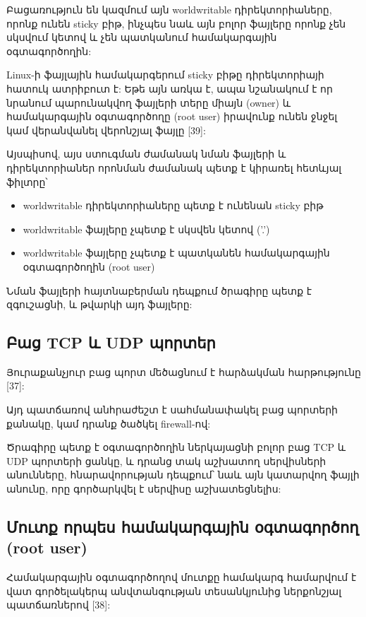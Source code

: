 \documentclass[a4paper,12pt]{article}
\begin{document}
\begin{sloppypar}
Բացառություն են կազմում այն worldwritable դիրեկտորիաները, որոնք ունեն
sticky բիթ, ինչպես նաև այն բոլոր ֆայլերը որոնք չեն սկսվում կետով և չեն
պատկանում համակարգային օգտագործողին:

Linux-ի ֆայլային համակարգերում sticky բիթը դիրեկտորիայի հատուկ ատրիբուտ է:
Եթե այն առկա է, ապա նշանակում է որ նրանում պարունակվող ֆայլերի տերը միայն (owner)
և համակարգային օգտագործողը (root user) իրավունք ունեն ջնջել կամ վերանվանել
վերոնշյալ ֆայլը [39]:

Այսպիսով, այս ստուգման ժամանակ նման ֆայլերի և դիրեկտորիաներ որոնման ժամանակ
պետք է կիրառել հետևյալ ֆիլտրը՝

\begin{itemize}
\item worldwritable դիրեկտորիաները պետք է ունենան sticky բիթ
\item worldwritable ֆայլերը չպետք է սկսվեն կետով ('.')
\item worldwritable ֆայլերը չպետք է պատկանեն համակարգային օգտագործողին
	(root user)
\end{itemize}

Նման ֆայլերի հայտնաբերման դեպքում ծրագիրը պետք է զգուշացնի,
և թվարկի այդ ֆայլերը:


\subsection{Բաց TCP և UDP պորտեր}


Յուրաքանչյուր բաց պորտ մեծացնում է հարձակման հարթությունը [37]:

Այդ պատճառով անհրաժեշտ է սահմանափակել բաց պորտերի քանակը,
կամ դրանք ծածկել firewall-ով:

Ծրագիրը պետք է օգտագործողին ներկայացնի բոլոր բաց 
TCP և UDP պորտերի ցանկը, և դրանց տակ աշխատող սերվիսների
անունները, հնարավորության դեպքում՝ նաև այն կատարվող
ֆայլի անունը, որը գործարկվել է սերվիսը աշխատեցնելիս:


\subsection{Մուտք որպես համակարգային օգտագործող (root user)}


Համակարգային օգտագործողով մուտքը համակարգ համարվում է վատ
գործելակերպ անվտանգության տեսանկյունից ներքոնշյալ պատճառներով [38]:


\end{sloppypar}
\end{document}
